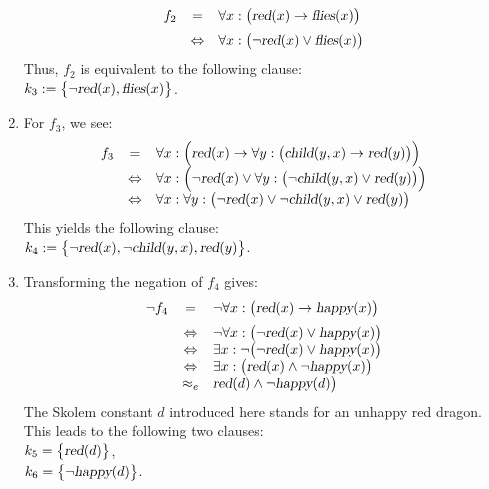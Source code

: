 \begin{enumerate}
 $$
        \begin{array}{lcl}
            f_2 & =  & \forall x: \bigl(\textsl{red}(x) \rightarrow \textsl{flies}(x) \bigr) \\[0.2cm]
            & \Leftrightarrow  & \forall x: \bigl(\neg \textsl{red}(x) \vee \textsl{flies}(x) \bigr)
        \end{array}
      $$ 
      Thus, $f_2$ is equivalent to the following clause: \\[0.2cm]
      \hspace*{1.3cm} $k_3 := \bigl\{ \neg \textsl{red}(x), \textsl{flies}(x) \bigl\}$.
\item For $f_3$, we see:
 $$
        \begin{array}{lcl}
          f_3 & =          & \forall x: \Bigl(\textsl{red}(x) \rightarrow 
                             \forall y: \bigl(\textsl{child}(y,x) \rightarrow \textsl{red}(y)\bigr) \Bigr) \\
          &\Leftrightarrow & \forall x: \Bigl(\neg \textsl{red}(x) \vee 
                             \forall y: \bigl(\neg \textsl{child}(y,x) \vee \textsl{red}(y)\bigr)\Bigr) \\
          &\Leftrightarrow & \forall x: \forall y: \bigl(\neg \textsl{red}(x) \vee \neg \textsl{child}(y,x) \vee \textsl{red}(y)\bigr) \\
        \end{array}
      $$
     This yields the following clause: \\[0.2cm]
     \hspace*{1.3cm} $ k_4 := \bigl\{ \neg \textsl{red}(x), \neg \textsl{child}(y,x), \textsl{red}(y)\bigl\}$.
\item Transforming the negation of $f_4$ gives:
 $$
        \begin{array}{lcl}
         \neg f_4 & =      & \neg \forall x: \bigl(\textsl{red}(x) \rightarrow \textsl{happy}(x)\bigr) 
         \\[0.2cm]
                  & \Leftrightarrow & \neg \forall x: \bigl(\neg \textsl{red}(x) \vee \textsl{happy}(x) \bigr) \\
                  & \Leftrightarrow & \exists x: \neg \bigl(\neg \textsl{red}(x) \vee \textsl{happy}(x) \bigr) \\
                  & \Leftrightarrow & \exists x: \bigl(\textsl{red}(x) \wedge \neg \textsl{happy}(x) \bigr)\\
                  & \approx_e & \textsl{red}(d) \wedge \neg \textsl{happy}(d) \bigr)\\
        \end{array}
      $$
      The Skolem constant $d$ introduced here stands for an unhappy red dragon.
      This leads to the following two clauses: \\[0.2cm]
      \hspace*{1.3cm} $k_5 = \bigl\{ \textsl{red}(d) \bigl\}$, \\[0.2cm]
      \hspace*{1.3cm} $k_6 = \bigl\{ \neg \textsl{happy}(d) \bigl\}$.
\end{enumerate}
